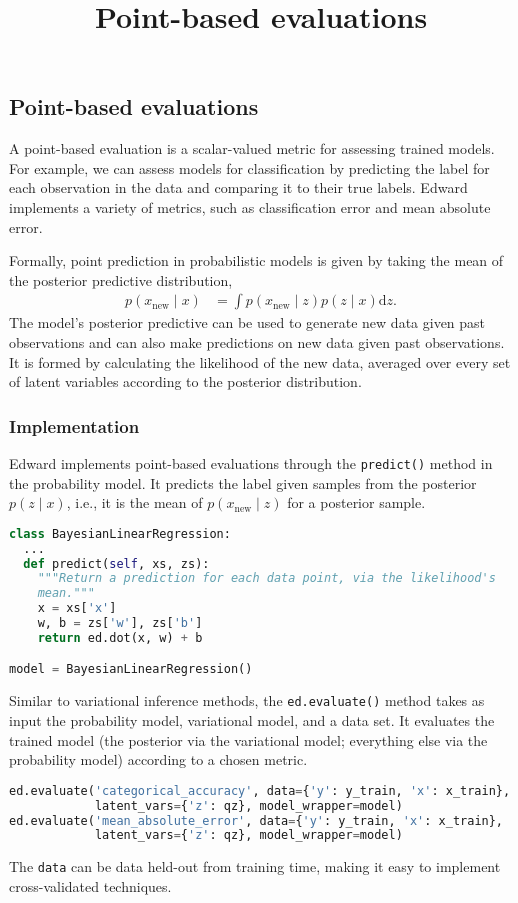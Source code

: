 \title{Point-based evaluations}

\subsection{Point-based evaluations}

A point-based evaluation is a scalar-valued metric for assessing
trained models. For example, we can assess models for classification
by predicting the label for each observation in the data and comparing
it to their true labels. Edward implements a variety of metrics, such
as classification error and mean absolute error.

Formally, point prediction in probabilistic models is given by
taking the mean of the posterior predictive distribution,
\begin{align*}
  p(x_\text{new} \mid x)
  &=
  \int
  p(x_\text{new} \mid z)
  p(z \mid x)
  \text{d} z.
\end{align*}
The model's posterior predictive can be used to generate new data
given past observations and can also make predictions on new data
given past observations.
It is formed by calculating the likelihood of the new data, averaged
over every set of latent variables according to the posterior
distribution.

\subsubsection{Implementation}

Edward implements point-based evaluations through the
\texttt{predict()} method in the probability model. It predicts the
label given samples from the posterior $p(z \mid x)$, i.e., it is the
mean of $p(x_\text{new} \mid z)$ for a posterior sample.
\begin{lstlisting}[language=Python]
class BayesianLinearRegression:
  ...
  def predict(self, xs, zs):
    """Return a prediction for each data point, via the likelihood's
    mean."""
    x = xs['x']
    w, b = zs['w'], zs['b']
    return ed.dot(x, w) + b

model = BayesianLinearRegression()
\end{lstlisting}
Similar to variational inference methods, the
\texttt{ed.evaluate()} method takes as input the probability model,
variational model, and a data set. It evaluates the trained model (the
posterior via the variational model; everything else via the
probability model) according to a chosen metric.
\begin{lstlisting}[language=Python]
ed.evaluate('categorical_accuracy', data={'y': y_train, 'x': x_train},
            latent_vars={'z': qz}, model_wrapper=model)
ed.evaluate('mean_absolute_error', data={'y': y_train, 'x': x_train},
            latent_vars={'z': qz}, model_wrapper=model)
\end{lstlisting}
The \texttt{data} can be data held-out from training time, making it
easy to implement cross-validated techniques.

